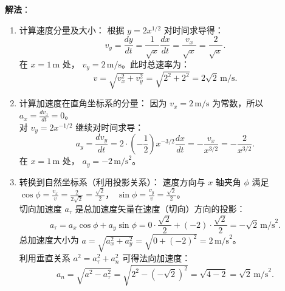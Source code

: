 \textbf{解法}：
\begin{enumerate}
    \item 计算速度分量及大小：
          根据 $y = 2x^{1/2}$ 对时间求导得：
          \[
              v_y = \frac{dy}{dt} = \frac{1}{\sqrt{x}}\frac{dx}{dt} = \frac{v_x}{\sqrt{x}} = \frac{2}{\sqrt{x}}.
          \]
          在 $x = 1\,\text{m}$ 处， $v_y = 2\,\text{m/s}$。此时总速率为：
          \[
              v = \sqrt{v_x^2 + v_y^2} = \sqrt{2^2 + 2^2} = 2\sqrt{2}\,\text{m/s}.
          \]
    \item 计算加速度在直角坐标系的分量：
          因为 $v_x = 2\,\text{m/s}$ 为常数，所以 $a_x = \frac{dv_x}{dt} = 0$。\\
          对 $v_y = 2x^{-1/2}$ 继续对时间求导：
          \[
              a_y = \frac{dv_y}{dt} = 2 \cdot \left(-\frac{1}{2}\right)x^{-3/2}\frac{dx}{dt} = -\frac{v_x}{x^{3/2}} = -\frac{2}{x^{3/2}}.
          \]
          在 $x = 1\,\text{m}$ 处， $a_y = -2\,\text{m/s}^2$。
    \item 转换到自然坐标系（利用投影关系）：
          速度方向与 $x$ 轴夹角 $\phi$ 满足 $\cos\phi = \frac{v_x}{v} = \frac{2}{2\sqrt{2}} = \frac{\sqrt{2}}{2}$， $\sin\phi = \frac{v_y}{v} = \frac{\sqrt{2}}{2}$。\\
          切向加速度 $a_\tau$ 是总加速度矢量在速度（切向）方向的投影：
          \[
              a_\tau = a_x\cos\phi + a_y\sin\phi = 0 \cdot \frac{\sqrt{2}}{2} + (-2) \cdot \frac{\sqrt{2}}{2} = -\sqrt{2}\,\text{m/s}^2.
          \]
          总加速度大小为 $a = \sqrt{a_x^2 + a_y^2} = \sqrt{0 + (-2)^2} = 2\,\text{m/s}^2$。\\
          利用垂直关系 $a^2 = a_\tau^2 + a_n^2$ 可得法向加速度：
          \[
              a_n = \sqrt{a^2 - a_\tau^2} = \sqrt{2^2 - (-\sqrt{2})^2} = \sqrt{4 - 2} = \sqrt{2}\,\text{m/s}^2.
          \]
\end{enumerate}